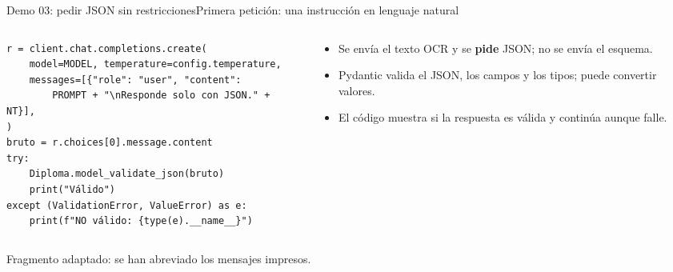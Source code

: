 \begin{frame}[fragile]{Demo 03: pedir JSON sin restricciones}{Primera petición: una instrucción en lenguaje natural}
	\begin{columns}[T]
		\begin{column}{0.58\textwidth}
			\begin{lstlisting}
r = client.chat.completions.create(
    model=MODEL, temperature=config.temperature,
    messages=[{"role": "user", "content":
        PROMPT + "\nResponde solo con JSON." + NT}],
)
bruto = r.choices[0].message.content
try:
    Diploma.model_validate_json(bruto)
    print("Válido")
except (ValidationError, ValueError) as e:
    print(f"NO válido: {type(e).__name__}")
\end{lstlisting}
		\end{column}
		\begin{column}{0.4\textwidth}
			\footnotesize
			\begin{itemize}
				\item Se envía el texto OCR y se \textbf{pide} JSON; no se envía el esquema.
				\item Pydantic valida el JSON, los campos y los tipos; puede convertir valores.
				\item El código muestra si la respuesta es válida y continúa aunque falle.
			\end{itemize}
		\end{column}
	\end{columns}
	{\scriptsize Fragmento adaptado: se han abreviado los mensajes impresos.}
\end{frame}

